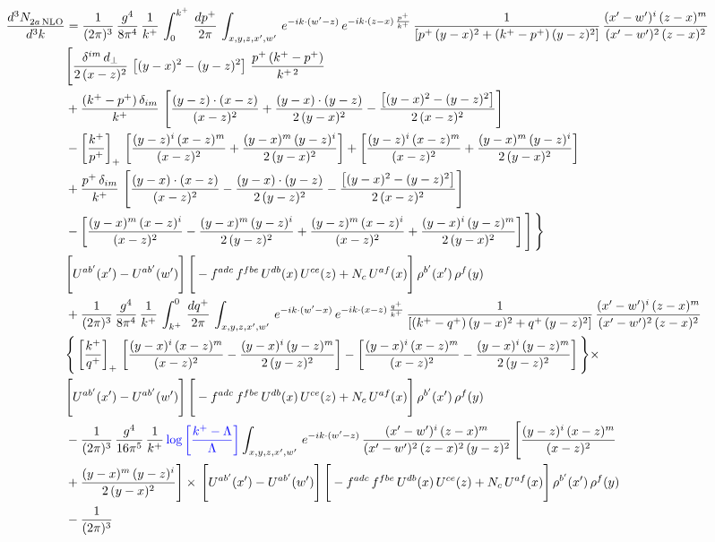 \documentclass[9pt]{article}
\numberwithin{equation}{section}
\begin{document}
\begin{align}
    \frac{d^{3}N_{2a\,\rm NLO}^{\rm}}{d^{3}k}  & =  \frac{1}{(2\pi)^{3}}\, \frac{g^{4}}{8\pi^{4}}\,\frac{1}{k^{+}}\,\int_{0}^{k^{+}}\, \frac{dp^{+}}{2\pi}\,\int_{x,y,z,x',w'}\, e^{-ik\cdot(w'-z)}\,e^{-ik\cdot (z-x)\,\frac{p^{+}}{k^{+}}}\,\frac{1}{\left[p^{+}\,(y-x)^{2}+(k^{+}-p^{+})\,(y-z)^{2}\right]}\, \frac{(x'-w')^{i}\,(z-x)^{m}}{(x'-w')^{2}\,(z-x)^{2}} \notag \\ & \Bigg[\frac{\delta^{im}\,d_{\perp}}{2\,(x-z)^{2}}\,\left[(y-x)^{2}-(y-z)^{2}\right]\,\frac{p^{+}\,(k^{+}-p^{+})}{k^{+\,2}}\notag \\ & +\frac{(k^{+}-p^{+})\,\delta_{im}}{k^{+}}\,\left[\frac{(y-z)\cdot (x-z)}{(x-z)^{2}}+\frac{(y-x)\cdot (y-z)}{2\,(y-x)^{2}}-\frac{\left[(y-x)^{2}-(y-z)^{2}\right]}{2\,(x-z)^{2}}\right]\notag \\ & -\left[\frac{k^{+}}{p^{+}}\right]_{+}\,\left[\frac{(y-z)^{i}\,(x-z)^{m}}{(x-z)^{2}}+\frac{(y-x)^{m}\,(y-z)^{i}}{2\,(y-x)^{2}}\right]+ \left[\frac{(y-z)^{i}\,(x-z)^{m}}{(x-z)^{2}}+\frac{(y-x)^{m}\,(y-z)^{i}}{2\,(y-x)^{2}}\right]\notag \\ & +\frac{p^{+}\,\delta_{im}}{k^{+}}\,\left[\frac{(y-x)\cdot (x-z)}{(x-z)^{2}}-\frac{(y-x)\cdot (y-z)}{2\,(y-z)^{2}}-\frac{\left[(y-x)^{2}-(y-z)^{2}\right]}{2\,(x-z)^{2}}\right]\notag \\ &-\left[\frac{(y-x)^{m}\,(x-z)^{i}}{(x-z)^{2}}-\frac{(y-x)^{m}\,(y-z)^{i}}{2\,(y-z)^{2}}+\frac{(y-z)^{m}\,(x-z)^{i}}{(x-z)^{2}}+\frac{(y-x)^{i}\,(y-z)^{m}}{2\,(y-x)^{2}}\right]\Bigg]\,\Bigg\} \notag \\ & \Bigg[U^{ab'}(x')-U^{ab'}(w')\Bigg]\,\Bigg[-f^{adc}\,f^{fbe}\,U^{db}(x)\,U^{ce}(z)+N_{c}\,U^{af}(x)\Bigg]\,\rho^{b'}(x')\,\rho^{f}(y)\notag \\ & + \frac{1}{(2\pi)^{3}}\,\frac{g^{4}}{8\pi^{4}}\,\frac{1}{k^{+}}\, \int^{0}_{k^{+}}\, \frac{dq^{+}}{2\pi} \,  \int_{x,y,z,x',w'}\,e^{-ik\cdot(w'-x)}\,e^{-ik\cdot (x-z)\,\frac{q^{+}}{k^{+}}}\,\frac{1}{\left[(k^{+}-q^{+})\,(y-x)^{2}+q^{+}\,(y-z)^{2}\right]}\, \frac{(x'-w')^{i}\,(z-x)^{m}}{(x'-w')^{2}\,(z-x)^{2}} \notag \\ &\Bigg\{\left[\frac{k^{+}}{q^{+}}\right]_{+}\,\left[\frac{(y-x)^{i}\,(x-z)^{m}}{(x-z)^{2}}-\frac{(y-x)^{i}\,(y-z)^{m}}{2\,(y-z)^{2}}\right] -\left[\frac{(y-x)^{i}\,(x-z)^{m}}{(x-z)^{2}}-\frac{(y-x)^{i}\,(y-z)^{m}}{2\,(y-z)^{2}}\right]\Bigg\}\times\,\notag \\ & \Bigg[U^{ab'}(x')-U^{ab'}(w')\Bigg]\,\Bigg[-f^{adc}\,f^{fbe}\,U^{db}(x)\,U^{ce}(z)+N_{c}\,U^{af}(x)\Bigg]\,\rho^{b'}(x')\,\rho^{f}(y)\notag \\ & - \frac{1}{(2\pi)^{3}}\, \frac{g^{4}}{16\pi^{5}}\,\frac{1}{k^{+}}\,{\color{blue}\log{\left[\frac{k^{+}-\Lambda}{\Lambda}\right]}} \int_{x,y,z,x',w'}\,e^{-ik\cdot(w'-z)}\, \frac{(x'-w')^{i}\,(z-x)^{m}}{(x'-w')^{2}\,(z-x)^{2}\, (y-z)^{2}}\,\Bigg[\frac{(y-z)^{i}\,(x-z)^{m}}{(x-z)^{2}}\notag \\ & +\frac{(y-x)^{m}\,(y-z)^{i}}{2\,(y-x)^{2}}\Bigg]\times\, \Bigg[U^{ab'}(x')-U^{ab'}(w')\Bigg]\,\Bigg[-f^{adc}\,f^{fbe}\,U^{db}(x)\,U^{ce}(z)+N_{c}\,U^{af}(x)\Bigg]\,\rho^{b'}(x')\,\rho^{f}(y)\notag \\ & - \frac{1}{(2\pi)^{3}}\, 
\end{align}
\end{document}
